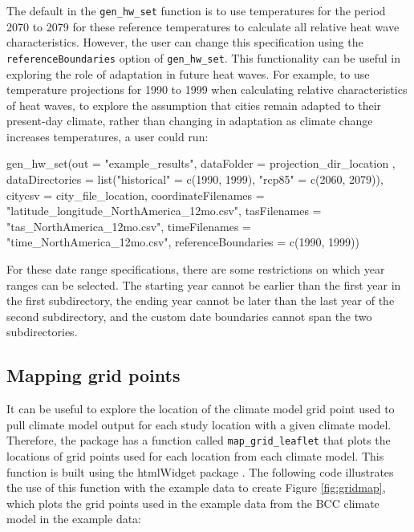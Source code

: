 The default in the \texttt{gen\_hw\_set} function is to use temperatures
for the period 2070 to 2079 for these reference temperatures to
calculate all relative heat wave characteristics. However, the user can
change this specification using the \texttt{referenceBoundaries} option
of \texttt{gen\_hw\_set}. This functionality can be useful in exploring
the role of adaptation in future heat waves. For example, to use
temperature projections for 1990 to 1999 when calculating relative
characteristics of heat waves, to explore the assumption that cities
remain adapted to their present-day climate, rather than changing in
adaptation as climate change increases temperatures, a user could run:

\begin{Schunk}
\begin{Sinput}
gen_hw_set(out = "example_results",
           dataFolder = projection_dir_location ,
           dataDirectories = list("historical" = c(1990, 1999),
                                        "rcp85" = c(2060, 2079)),
           citycsv = city_file_location,
           coordinateFilenames = "latitude_longitude_NorthAmerica_12mo.csv",
           tasFilenames = "tas_NorthAmerica_12mo.csv",
           timeFilenames = "time_NorthAmerica_12mo.csv",
           referenceBoundaries = c(1990, 1999))
\end{Sinput}
\end{Schunk}

For these date range specifications, there are some restrictions on
which year ranges can be selected. The starting year cannot be earlier
than the first year in the first subdirectory, the ending year cannot be
later than the last year of the second subdirectory, and the custom date
boundaries cannot span the two subdirectories.

\subsection{Mapping grid points}\label{mapping-grid-points}

It can be useful to explore the location of the climate model grid point
used to pull climate model output for each study location with a given
climate model. Therefore, the package has a function called
\texttt{map\_grid\_leaflet} that plots the locations of grid points used
for each location from each climate model. This function is built using
the htmlWidget  package \citep{leaflet}. The following code
illustrates the use of this function with the example data to create
Figure \ref{fig:gridmap}, which plots the grid points used in the
example data from the BCC climate model in the example data:

